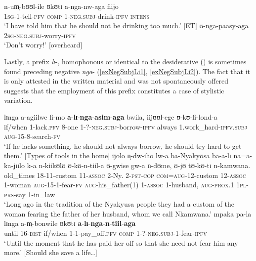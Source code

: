 \begin{exe}
\ex \label{exNegSubjContinuous}\gll n-um̩-bʊʊl-ile ʊkʊtɪ a-nga-nw-aga fiijo\\
\textsc{1sg}-1-tell-\textsc{pfv} \textsc{comp} 1-\textsc{neg.subj}-drink-\textsc{ipfv} \textsc{intens}\\
\glt \lq I have told him that he should not be drinking too much.' [ET]
\ex \label{exNegSubjMitigating}\gll ʊ-nga-paasy-aga\\
\textsc{2sg}-\textsc{neg.subj}-worry-\textsc{ipfv}\\
\glt \lq Don't worry!' [overheard]
\end{exe}

Lastly, a prefix \textit{lɪ}-, homophonous or identical to the desiderative () is sometimes found preceding negative \mbox{\textit{nga}-} (\ref{exNegSubjLi1}, \ref{exNegSubjLi2}). The fact that it is only attested in the written material and was not spontaneously offered suggests that the employment of this prefix constitutes a case of stylistic variation.

\begin{exe}
\ex \label{exNegSubjLi1} \gll lɪnga a-agiilwe fi-mo \textbf{a}-\textbf{lɪ}-\textbf{nga}-\textbf{asim}-\textbf{aga} bwila, iijʊʊl-ege ʊ-kʊ-fi-lond-a\\
if/when 1-lack\textsc{.pfv} 8-one 1-?-\textsc{neg.subj}-borrow-\textsc{ipfv} always 1.work\_hard-\textsc{ipfv.subj} \textsc{aug}-15-8-search-\textsc{fv}\\
\glt \lq If he lacks something, he should not always borrow, he should try hard to get them.' [Types of tools in the home]
\ex \label{exNegSubjLi2} \gll ijolo n̩-dw-iho lw-a ba-Nyakyʊsa ba-a-lɪ na=a-ka-jɪɪlo k-a n-kiikʊlʊ ʊ-kʊ-n-tiil-a ʊ-gwise gw-a n̩-dʊme, ʊ-jʊ tʊ-kʊ-tɪ n-kamwana.\\
old\_times 18-11-custom 11-\textsc{assoc} 2-Ny. 2-\textsc{pst}-\textsc{cop} \textsc{com}=\textsc{aug}-12-custom 12-\textsc{assoc} 1-woman \textsc{aug}-15-1-fear-\textsc{fv} \textsc{aug}-his\_father(1) 1-\textsc{assoc} 1-husband, \textsc{aug}-\textsc{prox.1} \textsc{1pl}-\textsc{prs}-say 1-in\_law\\
\glt `Long ago in the tradition of the Nyakyusa people they had a custom of the woman fearing the father of her husband, whom we call Nkamwana.'
\sn \gll mpaka pa-la lɪnga a-m̩-bonwile ʊkʊtɪ \textbf{a}-\textbf{lɪ}-\textbf{nga}-\textbf{n}-\textbf{tiil}-\textbf{aga}\\
until 16-\textsc{dist} if/when 1-1-pay\_off.\textsc{pfv} \textsc{comp} 1-?-\textsc{neg.subj}-1-fear-\textsc{ipfv}\\
\glt \lq Until the moment that he has paid her off so that she need not fear him any more.' [Should she save a life\ldots]  
\end{exe}
